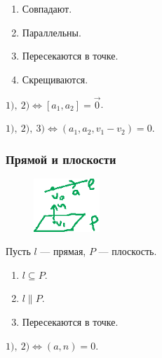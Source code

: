 \begin{enumerate}[nosep]
    \item \label{lec26:l3} Совпадают.
    \item \label{lec26:l4} Параллельны.
    \item \label{lec26:l5} Пересекаются в точке.
    \item Скрещиваются.
\end{enumerate}

\medskip
$\hyperref[lec26:l3]{1)}, \ \hyperref[lec26:l4]{2)} \iff [a_1, a_2] = \overrightarrow{0}$.

$\hyperref[lec26:l3]{1)}, \ \hyperref[lec26:l4]{2)}, \ \hyperref[lec26:l5]{3)} \iff (a_1, a_2, v_1 - v_2) = 0$.


\subsubsection{Прямой и плоскости}

\begin{figure}
    \vspace{-20pt}
    \includegraphics[height=2cm]{lecture26_drawing_6}
    \vspace{-110pt}
\end{figure}

Пусть $l$ --- прямая, $P$ --- плоскость.

\begin{enumerate}[nosep]
    \item \label{lec26:l6} $l \subseteq P$.
    \item \label{lec26:l7} $l \parallel P$.
    \item Пересекаются в точке.
\end{enumerate}

\medskip
$\hyperref[lec26:l6]{1)}, \ \hyperref[lec26:l7]{2)} \iff (a, n) = 0$.
